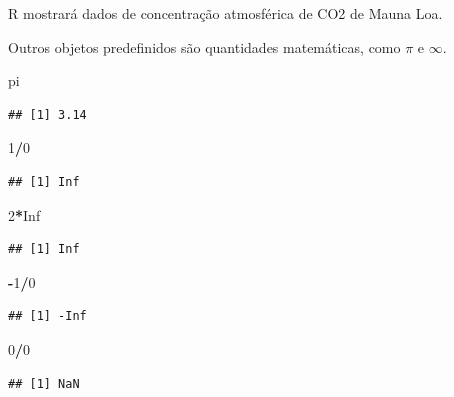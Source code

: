 \documentclass[
]{book}
\newenvironment{Shaded}{\begin{snugshade}}{\end{snugshade}}
\newcommand{\ConstantTok}[1]{\textcolor[rgb]{0.56,0.35,0.01}{#1}}
\newcommand{\DecValTok}[1]{\textcolor[rgb]{0.00,0.00,0.81}{#1}}
\newcommand{\NormalTok}[1]{#1}
\newcommand{\SpecialCharTok}[1]{\textcolor[rgb]{0.81,0.36,0.00}{\textbf{#1}}}
\begin{document}
R mostrará dados de concentração atmosférica de CO2 de Mauna Loa.

Outros objetos predefinidos são quantidades matemáticas, como \(\pi\) e \(\infty\).

\begin{Shaded}
\begin{Highlighting}[]
\NormalTok{pi}
\end{Highlighting}
\end{Shaded}

\begin{verbatim}
## [1] 3.14
\end{verbatim}

\begin{Shaded}
\begin{Highlighting}[]
\DecValTok{1}\SpecialCharTok{/}\DecValTok{0}  
\end{Highlighting}
\end{Shaded}

\begin{verbatim}
## [1] Inf
\end{verbatim}

\begin{Shaded}
\begin{Highlighting}[]
\DecValTok{2}\SpecialCharTok{*}\ConstantTok{Inf}
\end{Highlighting}
\end{Shaded}

\begin{verbatim}
## [1] Inf
\end{verbatim}

\begin{Shaded}
\begin{Highlighting}[]
\SpecialCharTok{{-}}\DecValTok{1}\SpecialCharTok{/}\DecValTok{0}
\end{Highlighting}
\end{Shaded}

\begin{verbatim}
## [1] -Inf
\end{verbatim}

\begin{Shaded}
\begin{Highlighting}[]
\DecValTok{0}\SpecialCharTok{/}\DecValTok{0}
\end{Highlighting}
\end{Shaded}

\begin{verbatim}
## [1] NaN
\end{verbatim}
\end{document}

